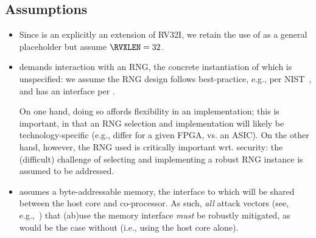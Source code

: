 
\subsection{Assumptions}
\label{sec:bg:assumption}

\begin{itemize}

\item Since \XCID is an explicitly an extension of RV32I, we retain the use
      of \RVXLEN as a general placeholder but assume $\RVXLEN = 32$.

\item \XCID demands interaction with an RNG, the concrete instantiation of 
      which is unspecified: we assume the RNG design follows best-practice,
      e.g., per NIST~\cite{SCARV:NIST:SP:800_90a,SCARV:NIST:SP:800_90b,SCARV:NIST:SP:800_90c},
      and has an interface per \cite[Section 6.4]{SCARV:NIST:SP:800_90c}.

      On one hand, doing so affords flexibility in an implementation; this 
      is important, in that an RNG selection and implementation will likely 
      be technology-specific (e.g., differ for a given FPGA, vs. an ASIC).  
      On the other hand, however, the RNG used is critically important wrt. 
      security: the (difficult) challenge of selecting and implementing 
      a robust RNG instance is assumed to be addressed.

\item \XCID assumes a byte-addressable memory, the interface to which will
      be shared between the host core and co-processor.  As such, {\em all}
      attack vectors
      (see, e.g.,~\cite{SCARV:GYCH:18})
      that (ab)use the memory interface {\em must} be robustly mitigated, 
      as would be the case without \XCID (i.e., using the host core alone).

\end{itemize}

